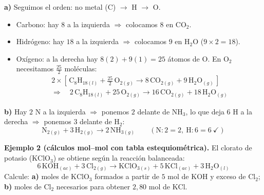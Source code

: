 \documentclass[12pt, letterpaper]{article}
\begin{document}
\begin{cuadrosolucion}[nobreak=true]
  \small
  \textbf{a)} Seguimos el orden: no metal ($\text{C}$) $\to$ $\text{H}$ $\to$ $\text{O}$.
  \begin{itemize}[leftmargin=*, nosep, topsep=2pt]
    \item Carbono: hay $8$ a la izquierda $\Rightarrow$ colocamos $8$ en $\text{CO}_2$.
    \item Hidrógeno: hay $18$ a la izquierda $\Rightarrow$ colocamos $9$ en $\text{H}_2\text{O}$ ($9\times 2 = 18$).
    \item Oxígeno: a la derecha hay $8(2) + 9(1) = 25$ átomos de O. En $\text{O}_2$ necesitamos $\frac{25}{2}$ moléculas:
          \begin{gather*}
            2\times\left[\,\text{C}_8\text{H}_{18(l)} + \tfrac{25}{2}\,\text{O}_{2(g)} \longrightarrow 8\,\text{CO}_{2(g)} + 9\,\text{H}_2\text{O}_{(g)}\,\right] \\[3pt]
            \Longrightarrow\quad
            \boxed{2\,\text{C}_8\text{H}_{18(l)} + 25\,\text{O}_{2(g)} \longrightarrow 16\,\text{CO}_{2(g)} + 18\,\text{H}_2\text{O}_{(g)}}
          \end{gather*}
  \end{itemize}
  \textbf{b)} Hay $2$ N a la izquierda $\Rightarrow$ ponemos $2$ delante de $\text{NH}_3$, lo que deja $6$ H a la derecha $\Rightarrow$ ponemos $3$ delante de $\text{H}_2$:
  \[
    \boxed{\text{N}_{2(g)} + 3\,\text{H}_{2(g)} \longrightarrow 2\,\text{NH}_{3(g)}}
    \qquad (\text{N}:2=2,\ \text{H}:6=6\ \checkmark)
  \]
\end{cuadrosolucion}

\medskip
\noindent\textbf{Ejemplo 2 (cálculos mol--mol con tabla estequiométrica).} El clorato de potasio ($\text{KClO}_3$) se obtiene según la reacción balanceada:
\[
  6\,\text{KOH}_{(ac)} + 3\,\text{Cl}_{2(g)} \longrightarrow \text{KClO}_{3(s)} + 5\,\text{KCl}_{(ac)} + 3\,\text{H}_2\text{O}_{(l)}
\]
Calcule: \textbf{a)} moles de $\text{KClO}_3$ formados a partir de $5\text{ mol}$ de $\text{KOH}$ y exceso de $\text{Cl}_2$; \textbf{b)} moles de $\text{Cl}_2$ necesarios para obtener $2{,}80\text{ mol}$ de $\text{KCl}$.
\end{document}
